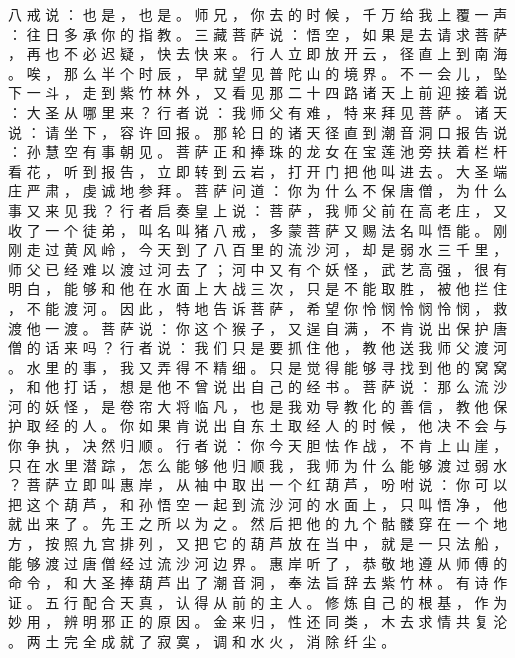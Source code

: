 {八 戒 说 ： 也 是 ， 也 是 。
师 兄 ， 你 去 的 时 候 ， 千 万 给 我 上 覆 一 声 ： 往 日 多 承 你 的 指 教 。
三 藏 菩 萨 说 ： 悟 空 ， 如 果 是 去 请 求 菩 萨 ， 再 也 不 必 迟 疑 ， 快 去 快 来 。
行 人 立 即 放 开 云 ， 径 直 上 到 南 海 。
唉 ， 那 么 半 个 时 辰 ， 早 就 望 见 普 陀 山 的 境 界 。
不 一 会 儿 ， 坠 下 一 斗 ， 走 到 紫 竹 林 外 ， 又 看 见 那 二 十 四 路 诸 天 上 前 迎 接 着 说 ： 大 圣 从 哪 里 来 ？ 行 者 说 ： 我 师 父 有 难 ， 特 来 拜 见 菩 萨 。
诸 天 说 ： 请 坐 下 ， 容 许 回 报 。
那 轮 日 的 诸 天 径 直 到 潮 音 洞 口 报 告 说 ： 孙 慧 空 有 事 朝 见 。
菩 萨 正 和 捧 珠 的 龙 女 在 宝 莲 池 旁 扶 着 栏 杆 看 花 ， 听 到 报 告 ， 立 即 转 到 云 岩 ， 打 开 门 把 他 叫 进 去 。
大 圣 端 庄 严 肃 ， 虔 诚 地 参 拜 。
菩 萨 问 道 ： 你 为 什 么 不 保 唐 僧 ， 为 什 么 事 又 来 见 我 ？ 行 者 启 奏 皇 上 说 ： 菩 萨 ， 我 师 父 前 在 高 老 庄 ， 又 收 了 一 个 徒 弟 ， 叫 名 叫 猪 八 戒 ， 多 蒙 菩 萨 又 赐 法 名 叫 悟 能 。
刚 刚 走 过 黄 风 岭 ， 今 天 到 了 八 百 里 的 流 沙 河 ， 却 是 弱 水 三 千 里 ， 师 父 已 经 难 以 渡 过 河 去 了 ； 河 中 又 有 个 妖 怪 ， 武 艺 高 强 ， 很 有 明 白 ， 能 够 和 他 在 水 面 上 大 战 三 次 ， 只 是 不 能 取 胜 ， 被 他 拦 住 ， 不 能 渡 河 。
因 此 ， 特 地 告 诉 菩 萨 ， 希 望 你 怜 悯 怜 悯 怜 悯 ， 救 渡 他 一 渡 。
菩 萨 说 ： 你 这 个 猴 子 ， 又 逞 自 满 ， 不 肯 说 出 保 护 唐 僧 的 话 来 吗 ？ 行 者 说 ： 我 们 只 是 要 抓 住 他 ， 教 他 送 我 师 父 渡 河 。
水 里 的 事 ， 我 又 弄 得 不 精 细 。
只 是 觉 得 能 够 寻 找 到 他 的 窝 窝 ， 和 他 打 话 ， 想 是 他 不 曾 说 出 自 己 的 经 书 。
菩 萨 说 ： 那 么 流 沙 河 的 妖 怪 ， 是 卷 帘 大 将 临 凡 ， 也 是 我 劝 导 教 化 的 善 信 ， 教 他 保 护 取 经 的 人 。
你 如 果 肯 说 出 自 东 土 取 经 人 的 时 候 ， 他 决 不 会 与 你 争 执 ， 决 然 归 顺 。
行 者 说 ： 你 今 天 胆 怯 作 战 ， 不 肯 上 山 崖 ， 只 在 水 里 潜 踪 ， 怎 么 能 够 他 归 顺 我 ， 我 师 为 什 么 能 够 渡 过 弱 水 ？ 菩 萨 立 即 叫 惠 岸 ， 从 袖 中 取 出 一 个 红 葫 芦 ， 吩 咐 说 ： 你 可 以 把 这 个 葫 芦 ， 和 孙 悟 空 一 起 到 流 沙 河 的 水 面 上 ， 只 叫 悟 净 ， 他 就 出 来 了 。
先 王 之 所 以 为 之 。
然 后 把 他 的 九 个 骷 髅 穿 在 一 个 地 方 ， 按 照 九 宫 排 列 ， 又 把 它 的 葫 芦 放 在 当 中 ， 就 是 一 只 法 船 ， 能 够 渡 过 唐 僧 经 过 流 沙 河 边 界 。
惠 岸 听 了 ， 恭 敬 地 遵 从 师 傅 的 命 令 ， 和 大 圣 捧 葫 芦 出 了 潮 音 洞 ， 奉 法 旨 辞 去 紫 竹 林 。
有 诗 作 证 。
五 行 配 合 天 真 ， 认 得 从 前 的 主 人 。
修 炼 自 己 的 根 基 ， 作 为 妙 用 ， 辨 明 邪 正 的 原 因 。
金 来 归 ， 性 还 同 类 ， 木 去 求 情 共 复 沦 。
两 土 完 全 成 就 了 寂 寞 ， 调 和 水 火 ， 消 除 纤 尘 。
}
